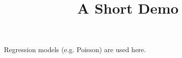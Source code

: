 \documentclass[article]{jss}
\title{A Short Demo}
\begin{document}
Regression models (e.g. Poisson) are used here.
\end{document}

